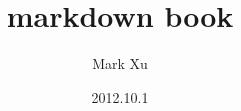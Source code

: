 \documentclass[11pt, a4paper]{book}
\begin{document}
\title{markdown book}
\author{Mark Xu}
\date{2012.10.1}
\maketitle
\tableofcontents\newpage\thispagestyle{empty}
\end{document}
